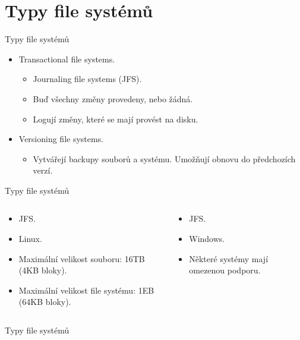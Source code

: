 \documentclass[aspectratio=169,xcolor=dvipsnames, t]{beamer}
\begin{document}
{\section{Typy file systémů}
\begin{frame}{Typy file systémů}
\begin{itemize}
    \item Transactional file systems.
    \begin{itemize}
    \item Journaling file systems (JFS).
    \item Buď všechny změny provedeny, nebo žádná.
    \item Logují změny, které se mají provést na disku.
    \end{itemize}
    \item Versioning file systems.
    \begin{itemize}
    \item Vytvářejí backupy souborů a systému. Umožňují obnovu do předchozích verzí.
    \end{itemize}
\end{itemize}
\end{frame}
\begin{frame}{Typy file systémů}
    \begin{columns}
    \begin{column}{0.45\textwidth}
        \begin{itemize}
            \item JFS.
            \item Linux.
            \item Maximální velikost souboru: 16TB (4KB bloky).
            \item Maximální velikost file systému: 1EB (64KB bloky).
        \end{itemize}
    \end{column}
    \begin{column}{0.45\textwidth}  %
        \begin{itemize}
            \item JFS.
            \item Windows.
            \item Některé systémy mají omezenou podporu.
        \end{itemize}
    \end{column}
    \end{columns}
\end{frame}
\begin{frame}{Typy file systémů}

\end{frame}}
\end{document}
